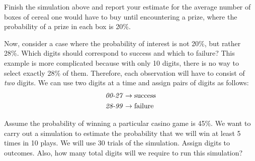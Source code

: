 \begin{exercisewrap}
\begin{nexercise}Finish the simulation above and report your estimate for the average number of boxes of cereal one would have to buy until encountering a prize, where the probability of a prize in each box is 20\%.\footnotemark
\end{nexercise}
\end{exercisewrap}



\begin{examplewrap}
\begin{nexample}{Now, consider a case where the probability of interest is not 20\%, but rather 28\%. Which digits should correspond to success and which to failure?}
This example is more complicated because with only 10 digits, there is no way to select exactly 28\% of them. Therefore, each observation will have to consist of \emph{two} digits. We can use two digits at a time and assign pairs of digits as follows:
\begin{align*}
\text{\emph{00-27}} &\rightarrow \text{success}\\
\text{\emph{28-99}} &\rightarrow \text{failure}
\end{align*}
\end{nexample}
\end{examplewrap}

\begin{exercisewrap}
\begin{nexercise}Assume the probability of winning a particular casino game is 45\%. We want to carry out a simulation to estimate the probability that we will win at least 5 times in 10 plays. We will use 30 trials of the simulation. Assign digits to outcomes. Also, how many total digits will we require to run this simulation?\footnotemark
\end{nexercise}
\end{exercisewrap}

\D{\newpage}

